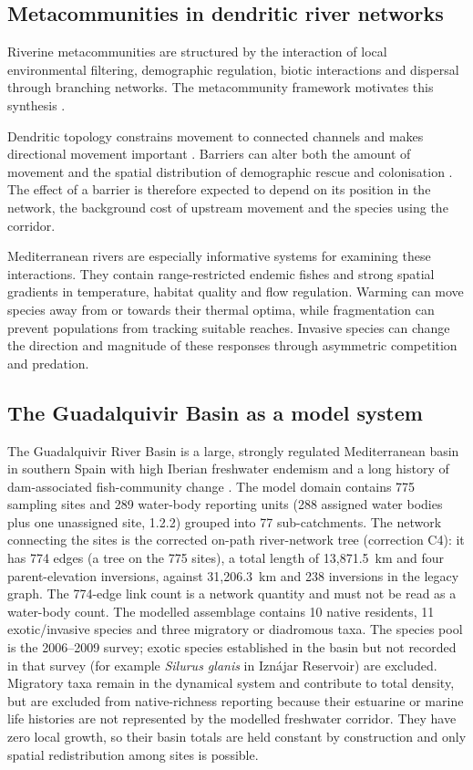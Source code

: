 \documentclass[11pt,a4paper]{article}
\begin{document}
\subsection{Metacommunities in dendritic river networks}

Riverine metacommunities are structured by the interaction of local environmental filtering, demographic regulation, biotic interactions and dispersal through branching networks. The metacommunity framework motivates this synthesis \cite{leibold2004metacommunity}.

Dendritic topology constrains movement to connected channels and makes directional movement important \cite{altermatt2013dendritic}. Barriers can alter both the amount of movement and the spatial distribution of demographic rescue and colonisation \cite{PerkinGido2012}. The effect of a barrier is therefore expected to depend on its position in the network, the background cost of upstream movement and the species using the corridor.

Mediterranean rivers are especially informative systems for examining these interactions. They contain range-restricted endemic fishes and strong spatial gradients in temperature, habitat quality and flow regulation. Warming can move species away from or towards their thermal optima, while fragmentation can prevent populations from tracking suitable reaches. Invasive species can change the direction and magnitude of these responses through asymmetric competition and predation.

\subsection{The Guadalquivir Basin as a model system}

The Guadalquivir River Basin is a large, strongly regulated Mediterranean basin in southern Spain with high Iberian freshwater endemism and a long history of dam-associated fish-community change \cite{RamosMerchante2018}. The model domain contains 775 sampling sites and 289 water-body reporting units (288 assigned water bodies plus one unassigned site, 1.2.2) grouped into 77 sub-catchments. The network connecting the sites is the corrected on-path river-network tree (correction C4): it has 774 edges (a tree on the 775 sites), a total length of 13{,}871.5~km and four parent-elevation inversions, against 31{,}206.3~km and 238 inversions in the legacy graph. The 774-edge link count is a network quantity and must not be read as a water-body count. The modelled assemblage contains 10 native residents, 11 exotic/invasive species and three migratory or diadromous taxa. The species pool is the 2006--2009 survey; exotic species established in the basin but not recorded in that survey (for example \textit{Silurus glanis} in Iznájar Reservoir) are excluded. Migratory taxa remain in the dynamical system and contribute to total density, but are excluded from native-richness reporting because their estuarine or marine life histories are not represented by the modelled freshwater corridor. They have zero local growth, so their basin totals are held constant by construction and only spatial redistribution among sites is possible.
\end{document}
